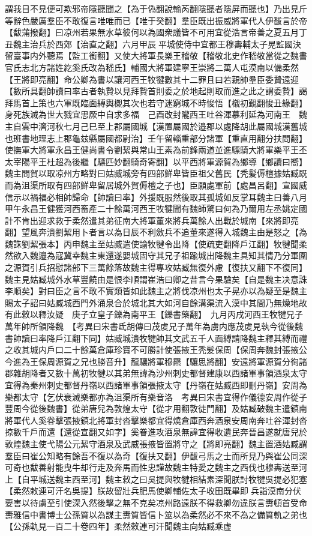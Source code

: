 謂我目不見便可欺邪帝隱聽聞之【為于偽翻說輸芮翻隱聽者隱屏而聽也】乃出見斤等辭色嚴厲羣臣不敢復言唯唯而已【唯于癸翻】羣臣既出振威將軍代人伊馛言於帝【馛蒲撥翻】曰凉州若果無水草彼何以為國衆議皆不可用宜從浩言帝善之夏五月丁丑魏主治兵於西郊【治直之翻】六月甲辰平城使侍中宜都王穆夀輔太子晃監國決留臺事内外聽焉【監工銜翻】又使大將軍長樂王稽敬【稽敬北史作嵇敬當從之魏書官氏志北方諸姓紇奚氏改為嵇氏】輔國大將軍建寧王崇將二萬人屯漠南以備柔然【王將即亮翻】命公卿為書以讓河西王牧犍數其十二罪且曰若親帥羣臣委贄遠迎【數所具翻帥讀曰率古者執贄以見拜贄首則委之於地起則取而進之此之謂委贄】謁拜馬首上策也六軍既臨面縛輿櫬其次也若守迷窮城不時悛悟【櫬初覲翻悛丑緣翻】身死族滅為世大戮宜思厥中自求多福　己酉改封隴西王吐谷渾慕利延為河南王　魏主自雲中濟河秋七月己巳至上郡屬國城【漢置屬國於邉郡以處降胡此屬國城漢舊城也班書地理志上郡龜兹縣屬國都尉治】壬午留輜重部分諸軍【重直用翻分扶問翻】使撫軍大將軍永昌王健尚書令劉絜與常山王素為前鋒兩道並進驃騎大將軍樂平王丕太宰陽平王杜超為後繼【驃匹妙翻騎奇寄翻】以平西將軍源賀為鄉導【鄉讀曰嚮】魏主問賀以取凉州方略對曰姑臧城旁有四部鮮卑皆臣祖父舊民【秃髪傉檀據姑臧既而為沮渠所取有四部鮮卑留居城外賀傉檀之子也】臣願處軍前【處昌呂翻】宣國威信示以禍福必相帥歸命【帥讀曰率】外援既服然後取其孤城如反掌耳魏主曰善八月甲午永昌王健獲河西畜產二十餘萬河西王牧犍聞有魏師驚曰何為乃爾用左丞姚定國計不肯出迎求救于柔然遣其弟征南大將軍董來將兵萬餘人出戰於城南【來將即亮翻】望風奔潰劉絜用卜者言以為日辰不利斂兵不追董來遂得入城魏主由是怒之【為魏誅劉絜張本】丙申魏主至姑臧遣使諭牧犍令出降【使疏吏翻降戶江翻】牧犍聞柔然欲入魏邉為寇冀幸魏主東還遂嬰城固守其兄子祖踰城出降魏主具知其情乃分軍圍之源賀引兵招慰諸部下三萬餘落故魏主得專攻姑臧無復外慮【復扶又翻下不復同】魏主見姑臧城外水草豐饒由是恨李順謂崔浩曰卿之昔言今果驗矣【自是魏主决意誅李順矣】對曰臣之言不敢不實類皆如此魏主之將伐凉州也太子晃亦以為疑至是魏主賜太子詔曰姑臧城西門外涌泉合於城北其大如河自餘溝渠流入漠中其間乃無燥地故有此敕以釋汝疑　庚子立皇子鑠為南平王【鑠書藥翻】　九月丙戌河西王牧犍兄子萬年帥所領降魏　【考異曰宋書氐胡傳曰茂䖍兄子萬年為虜内應茂䖍見執今從後魏書帥讀曰率降戶江翻下同】姑臧城潰牧犍帥其文武五千人面縛請降魏主釋其縛而禮之收其城内戶口二十餘萬倉庫珍寶不可勝計使張掖王秃髮保周【保周奔魏封張掖公今進為王保周源賀之兄也勝音升】龍驤將軍穆羆【驤思將翻】安遠將軍源賀分徇諸郡雜胡降者又數十萬初牧犍以其弟無諱為沙州刺史都督建康以西諸軍事領酒泉太守宜得為秦州刺史都督丹嶺以西諸軍事領張掖太守【丹嶺在姑臧西即刪丹嶺】安周為樂都太守【乞伏衰滅樂都亦為沮渠所有樂音洛　考異曰宋書宜得作儀德安周作從子豐周今從後魏書】從弟唐兒為敦煌太守【從才用翻敦徒門翻】及姑臧破魏主遣鎮南將軍代人奚眷擊張掖鎮北將軍封沓擊樂都宜得燒倉庫西奔酒泉安周南奔吐谷渾封沓掠數千戶而還【還從宣翻又如字】奚眷進攻酒泉無諱宜得收遺民奔晉昌遂就唐兒於敦煌魏主使弋陽公元絜守酒泉及武威張掖皆置將守之【將即亮翻】魏主置酒姑臧謂羣臣曰崔公知略有餘吾不復以為奇【復扶又翻】伊馛弓馬之士而所見乃與崔公同深可奇也馛善射能曳牛却行走及奔馬而性忠謹故魏主特愛之魏主之西伐也穆夀送至河上【自平城送魏主西至河】魏主敕之曰吳提與牧犍相結素深聞朕討牧犍吳提必犯塞【柔然敕連可汗名吳提】朕故留壯兵肥馬使卿輔佐太子收田既畢即兵詣漠南分伏要害以待虜至引使深入然後擊之無不克矣凉州路遠朕不得救卿勿違朕言夀頓首受命夀雅信中書博士公孫質以為謀主夀質皆信卜筮以為柔然必不來不為之備質軌之弟也【公孫軌見一百二十卷四年】柔然敕連可汗聞魏主向姑臧乘虚